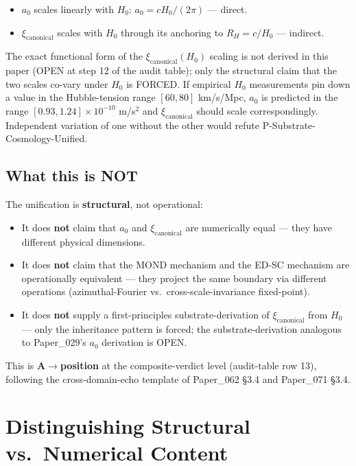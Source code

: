 \documentclass[11pt,a4paper]{article}
\begin{document}
\begin{itemize}[noitemsep]
\item $a_0$ scales linearly with $H_0$: $a_0 = cH_0/(2\pi)$ --- direct.
\item $\xi_\mathrm{canonical}$ scales with $H_0$ through its anchoring to $R_H = c/H_0$ --- indirect.
\end{itemize}

The exact functional form of the $\xi_\mathrm{canonical}(H_0)$ scaling is not derived in this paper (OPEN at step 12 of the audit table); only the structural claim that the two scales co-vary under $H_0$ is FORCED. If empirical $H_0$ measurements pin down a value in the Hubble-tension range $[60, 80]$ km/s/Mpc, $a_0$ is predicted in the range $[0.93, 1.24] \times 10^{-10}$ m/s$^2$ and $\xi_\mathrm{canonical}$ should scale correspondingly. Independent variation of one without the other would refute P-Substrate-Cosmology-Unified.

\subsection{What this is NOT}

The unification is \textbf{structural}, not operational:

\begin{itemize}[noitemsep]
\item It does \textbf{not} claim that $a_0$ and $\xi_\mathrm{canonical}$ are numerically equal --- they have different physical dimensions.
\item It does \textbf{not} claim that the MOND mechanism and the ED-SC mechanism are operationally equivalent --- they project the same boundary via different operations (azimuthal-Fourier vs.\ cross-scale-invariance fixed-point).
\item It does \textbf{not} supply a first-principles substrate-derivation of $\xi_\mathrm{canonical}$ from $H_0$ --- only the inheritance pattern is forced; the substrate-derivation analogous to Paper\_029's $a_0$ derivation is OPEN.
\end{itemize}

This is \textbf{A$\to$position} at the composite-verdict level (audit-table row 13), following the cross-domain-echo template of Paper\_062 \S3.4 and Paper\_071 \S3.4.

\section{Distinguishing Structural vs.\ Numerical Content}
\end{document}
